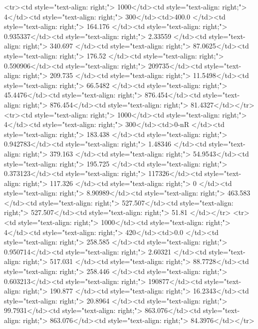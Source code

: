 <tr><td style="text-align: right;">      1000</td><td style="text-align: right;">         4</td><td style="text-align: right;">           300</td><td>400.0        </td><td style="text-align: right;">               164.176 </td><td style="text-align: right;">           0.935337</td><td style="text-align: right;">         2.33559 </td><td style="text-align: right;">        340.697 </td><td style="text-align: right;">            87.0625</td><td style="text-align: right;">             176.52    </td><td style="text-align: right;">             0.590906</td><td style="text-align: right;">              209735</td><td style="text-align: right;">                      209.735 </td><td style="text-align: right;">            11.5498</td><td style="text-align: right;">                66.5482 </td><td style="text-align: right;">        45.4476</td><td style="text-align: right;">    876.454</td><td style="text-align: right;">       876.454</td><td style="text-align: right;">                 81.4327</td></tr>
<tr><td style="text-align: right;">      1000</td><td style="text-align: right;">         4</td><td style="text-align: right;">           300</td><td>0-nR         </td><td style="text-align: right;">               183.438 </td><td style="text-align: right;">           0.942783</td><td style="text-align: right;">         1.48346 </td><td style="text-align: right;">        379.163 </td><td style="text-align: right;">            54.9543</td><td style="text-align: right;">             195.725   </td><td style="text-align: right;">             0.373123</td><td style="text-align: right;">              117326</td><td style="text-align: right;">                      117.326 </td><td style="text-align: right;">             0     </td><td style="text-align: right;">                 8.90989</td><td style="text-align: right;">       463.583 </td><td style="text-align: right;">    527.507</td><td style="text-align: right;">       527.507</td><td style="text-align: right;">                 51.81  </td></tr>
<tr><td style="text-align: right;">      1000</td><td style="text-align: right;">         4</td><td style="text-align: right;">           420</td><td>0.0          </td><td style="text-align: right;">               258.585 </td><td style="text-align: right;">           0.950714</td><td style="text-align: right;">         2.60321 </td><td style="text-align: right;">        517.031 </td><td style="text-align: right;">            88.7728</td><td style="text-align: right;">             258.446   </td><td style="text-align: right;">             0.603213</td><td style="text-align: right;">              190877</td><td style="text-align: right;">                      190.877 </td><td style="text-align: right;">            16.2343</td><td style="text-align: right;">                20.8964 </td><td style="text-align: right;">        99.7931</td><td style="text-align: right;">    863.076</td><td style="text-align: right;">       863.076</td><td style="text-align: right;">                 84.3976</td></tr>
